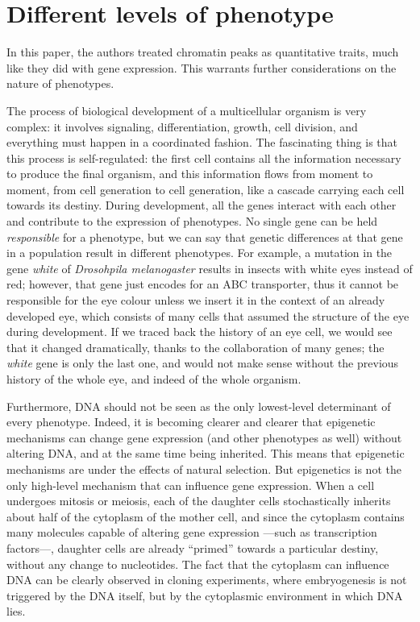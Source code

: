 \documentclass[../main.tex]{subfiles}
\begin{document}
\section{Different levels of phenotype}

In this paper, the authors treated chromatin peaks as quantitative 
traits, much like they did with gene expression. This warrants further 
considerations on the nature of phenotypes.

The process of biological development of a multicellular organism is 
very complex: it involves signaling, differentiation, growth, cell 
division, and everything must happen in a coordinated fashion. The 
fascinating thing is that this process is self-regulated: the first cell 
contains all the information necessary to produce the final organism, 
and this information flows from moment to moment, from cell generation 
to cell generation, like a cascade carrying each cell towards its 
destiny. During development, all the genes interact with each other and 
contribute to the expression of phenotypes. No single gene can be held 
\textit{responsible} for a phenotype, but we can say that genetic 
differences at that gene in a population result in different 
phenotypes\cite{Griffiths2000}. For example, a mutation in the gene 
\textit{white} of \textit{Drosohpila melanogaster} results in insects 
with white eyes instead of red; however, that gene just encodes for an 
ABC transporter\cite{Mackenzie1999}, thus it cannot be responsible for 
the eye colour unless we insert it in the context of an already 
developed eye, which consists of many cells that assumed the structure 
of the eye during development. If we traced back the history of an eye 
cell, we would see that it changed dramatically, thanks to the 
collaboration of many genes; the \textit{white} gene is only the last 
one, and would not make sense without the previous history of the whole 
eye, and indeed of the whole organism.

Furthermore, DNA should not be seen as the only lowest-level determinant 
of every phenotype. Indeed, it is becoming clearer and clearer that 
epigenetic mechanisms can change gene expression (and other phenotypes 
as well) without altering DNA, and at the same time being inherited. 
This means that epigenetic mechanisms are under the effects of natural 
selection\cite{Hunter2009}. But epigenetics is not the only high-level 
mechanism that can influence gene expression. When a cell undergoes 
mitosis or meiosis, each of the daughter cells stochastically inherits 
about half of the cytoplasm of the mother cell, and since the cytoplasm 
contains many molecules capable of altering gene expression ---such as 
transcription factors---, daughter cells are already \enquote{primed} 
towards a particular destiny, without any change to nucleotides. The 
fact that the cytoplasm can influence DNA can be clearly observed in 
cloning experiments, where embryogenesis is not triggered by the DNA 
itself, but by the cytoplasmic environment in which DNA lies.
\end{document}
